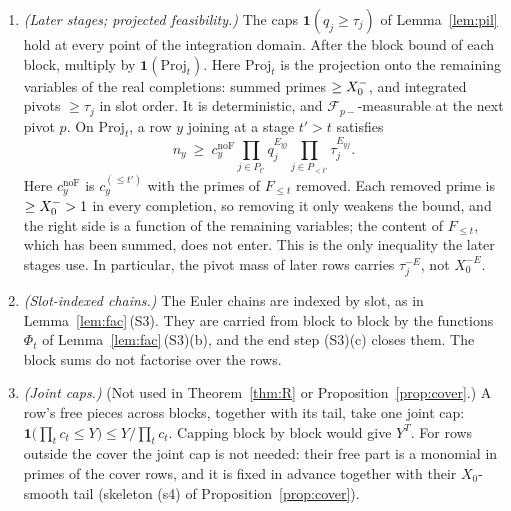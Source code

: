 \begin{theorem}
\begin{enumerate}[label=(\roman*),leftmargin=*]
\item \emph{(Later stages; projected feasibility.)} The caps $\mathbf 1(q_j\ge\tau_j)$ of Lemma~\ref{lem:pil} hold at every
  point of the integration domain. After the block bound of each block, multiply by $\mathbf 1(\mathrm{Proj}_t)$.
  Here $\mathrm{Proj}_t$ is the projection onto the remaining variables of the real completions: summed primes
  $\ge X_0^{-}$, and integrated pivots $\ge\tau_j$ in slot order.
  It is deterministic, and $\mathcal F_{p-}$-measurable at
  the next pivot $p$. On $\mathrm{Proj}_t$, a row $y$ joining at a stage $t'>t$ satisfies
  \begin{equation}\label{eq:B1}
    n_y\ \ge\ c_y^{\mathrm{noF}}\prod_{j\in P_{t'}}q_j^{E_{yj}}\prod_{j\in P_{<t'}}\tau_j^{E_{yj}}.
  \end{equation}
  Here $c_y^{\mathrm{noF}}$ is $c_y^{(\le t')}$ with the primes of $F_{\le t}$ removed. Each removed prime is $\ge X_0^{-}>1$
  in every completion, so removing it only weakens the bound, and the right side is a function of the remaining
  variables; the content of $F_{\le t}$, which has been summed, does not enter. This is the only inequality the later
  stages use. In particular, the pivot mass of
  later rows carries $\tau_j^{-E}$, not $X_0^{-E}$.
\item \emph{(Slot-indexed chains.)} The Euler chains are indexed by slot, as in Lemma~\ref{lem:fac}\,(S3). They are
  carried from block to block by the functions $\Phi_t$ of Lemma~\ref{lem:fac}\,(S3)(b), and the end step (S3)(c) closes
  them. The block sums do not factorise over the rows.
\item \emph{(Joint caps.)} (Not used in Theorem~\ref{thm:R} or Proposition~\ref{prop:cover}.) A row's free pieces across blocks, together with its tail, take one joint cap:
  $\mathbf 1\bigl(\prod_tc_t\le Y\bigr)\le Y/\prod_tc_t$. Capping block by block would give $Y^{T}$. For rows outside the
  cover the joint cap is not needed: their free part is a monomial in primes of the cover rows, and it is fixed in
  advance together with their $X_0$-smooth tail (skeleton (s4) of Proposition~\ref{prop:cover}).
\end{enumerate}
\end{theorem}

